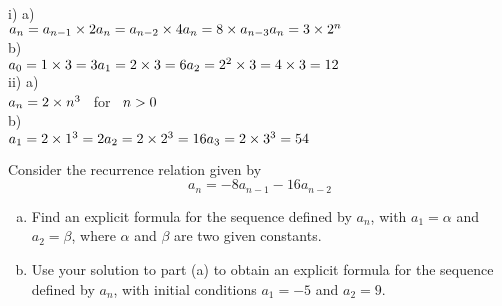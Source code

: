 \documentclass[addpoints,10pt,answers]{exam}
\begin{document}
\begin{questions}
\begin{solution}
i) a)\\$a_n=a_{n-1}\times 2\\ a_n=a_{n-2}\times 4\\ a_n=8\times a_{n-3}\\ a_n=3\times 2^n$\\
b)\\$a_0=1\times 3=3\\ a_1=2\times 3=6\\ a_2=2^2\times 3=4\times 3=12$\\
ii) a)\\$a_n=2\times n^3\hspace{3mm}$for$\hspace{3mm}n>0$\\
b)\\$a_1=2\times 1^3=2\\ a_2=2\times 2^3=16\\ a_3=2\times 3^3=54$
\end{solution}


\question[12]
Consider the recurrence relation given
by $$a_n = -8a_{n-1} -16a_{n-2}$$
\begin{enumerate}[(a)]
\item Find an explicit formula for the sequence defined by $a_n$, with  
$a_1 = \alpha$ and $a_2 = \beta$, where $\alpha$ and $\beta$ are two given constants.
\item Use your solution to part (a) to 
obtain an explicit formula for the sequence defined by $a_n$, with initial conditions $a_1 = -5$ and $a_2 = 9$.
\end{enumerate}


\end{questions}
\end{document}
